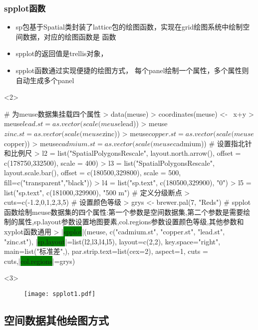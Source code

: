 \subsubsection{spplot函数}
\begin{frame}[t,fragile]{\subsecname}{\subsubsecname}
\begin{itemize} 
\item<1-> sp包基于Spatial类封装了lattice包的绘图函数，实现在grid绘图系统中绘制空间数据，对应的绘图函数是
函数
\item<1-> spplot的返回值是trellis对象，
\item<2-> spplot函数通过实现便捷的绘图方式，
每个panel绘制一个属性，多个属性则自动生成多个panel
\end{itemize}

\begin{overlayarea}{\textwidth}{\textheight}
\begin{onlyenv}<2>
\begin{rcode}
# 为meuse数据集挂载四个属性
> data(meuse)
> coordinates(meuse) <- ~x+y
> meuse$lead.st = as.vector(scale(meuse$lead))
> meuse$zinc.st = as.vector(scale(meuse$zinc))
> meuse$copper.st = as.vector(scale(meuse$copper))
> meuse$cadmium.st = as.vector(scale(meuse$cadmium))
# 设置指北针和比例尺
> l2 = list("SpatialPolygonsRescale", layout.north.arrow(), offset = c(178750,332500), scale = 400)
> l3 = list("SpatialPolygonsRescale", layout.scale.bar(), offset = c(180500,329800), scale = 500, fill=c("transparent","black"))
> l4 = list("sp.text", c(180500,329900), "0")
> l5 = list("sp.text", c(181000,329900), "500 m")
# 定义分级断点
> cuts=c(-1.2,0,1,2,3,5)
# 设置颜色等级
> grys <- brewer.pal(7, "Reds")
# spplot函数绘制meuse数据集的四个属性:第一个参数是空间数据集,第二个参数是需要绘制的属性,sp.layout参数设置地图要素,col.regions参数设置颜色等级,其他参数和xyplot函数通用
> |\colorbox{green}{spplot}|(meuse, c("cadmium.st", "copper.st", "lead.st", "zinc.st"),
        |\colorbox{green}{sp.layout}|=list(l2,l3,l4,l5), layout=c(2,2),
        key.space="right", main=list("标准差",), 
        par.strip.text=list(cex=2), aspect=1,
        cuts = cuts,|\colorbox{green}{col.regions}|=grys)
\end{rcode}
\end{onlyenv}

\begin{onlyenv}<3>
\begin{figure}[ht] \vspace{-20pt}
  \centering 
  \texttt{[image: spplot1.pdf]}
\end{figure}
\end{onlyenv}
\end{overlayarea}
\end{frame}

\subsection{空间数据其他绘图方式}
